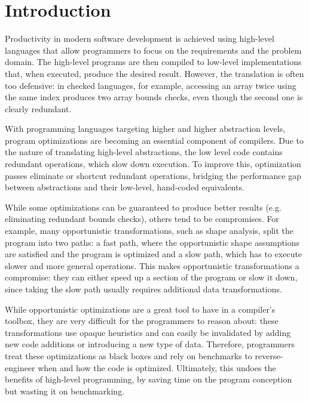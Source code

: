 \section{Introduction}
\label{sec:intro}


Productivity in modern software development is achieved using high-level languages that allow programmers to focus on the requirements and the problem domain. The high-level programs are then compiled to low-level implementations that, when executed, produce the desired result. However, the translation is often too defensive: in checked languages, for example, accessing an array twice using the same index produces two array bounds checks, even though the second one is clearly redundant.

With programming languages targeting higher and higher abstraction levels, program optimizations are becoming an essential component of compilers. Due to the nature of translating high-level abstractions, the low level code contains redundant operations, which slow down execution. To improve this, optimization passes eliminate or shortcut redundant operations, bridging the performance gap between abstractions and their low-level, hand-coded equivalents.

While some optimizations can be guaranteed to produce better results (e.g. eliminating redundant bounds checks), others tend to be compromises. For example, many opportunistic transformations, such as shape analysis, split the program into two paths: a fast path, where the opportunistic shape assumptions are satisfied and the program is optimized and a slow path, which has to execute slower and more general operations. This makes opportunistic transformations a compromise: they can either speed up a section of the program or slow it down, since taking the slow path usually requires additional data transformations.

While opportunistic optimizations are a great tool to have in a compiler's toolbox, they are very difficult for the programmers to reason about: these transformations use opaque heuristics and can easily be invalidated by adding new code additions or introducing a new type of data. Therefore, programmers treat these optimizations as black boxes and rely on benchmarks to reverse-engineer when and how the code is optimized. Ultimately, this undoes the benefits of high-level programming, by saving time on the program conception but wasting it on benchmarking.

